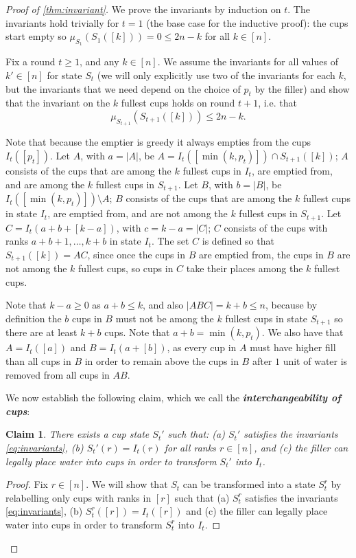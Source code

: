 \documentclass[twocolumn]{article}[10pt]
\newcommand{\defn}[1]{{\textit{\textbf{\boldmath #1}}}\xspace}
\newtheorem{clm}{Claim}
\begin{document}
\begin{proof}[Proof of \cref{thm:invariant}]
We prove the invariants by induction on $t$.
The invariants hold trivially for $t=1$ (the base case for the inductive proof): 
the cups start empty so $\mu_{S_1}(S_1([k])) = 0 \le 2n-k$ for all $k \in [n]$.

Fix a round $t \ge 1$, and any $k \in [n]$. We assume the invariants for all
values of $k' \in[n]$ for state $S_t$ (we will only explicitly use two of the
invariants for each $k$, but the invariants that we need depend on the
choice of $p_t$ by the filler) and show that
the invariant on the $k$ fullest cups holds on round $t+1$, i.e. that
$$\mu_{S_{t+1}}(S_{t+1}([k])) \le 2n-k.$$

Note that because the emptier is greedy it always empties from the cups
$I_t([p_t])$. Let $A$, with $a=|A|$, be $A = I_t([\min(k, p_t)]) \cap
S_{t+1}([k])$; $A$ consists of the cups that are among the $k$ fullest cups in
$I_t$, are emptied from, and are among the $k$ fullest cups in $S_{t+1}$. Let
$B$, with $b=|B|$, be $I_t([\min(k, p_t)]) \setminus A$; $B$ consists of the
cups that are among the $k$ fullest cups in state $I_t$, are emptied from, and
are not among the $k$ fullest cups in $S_{t+1}$. Let $C = I_t(a+b+[k-a])$, with
$c=k-a = |C|$; $C$ consists of the cups with ranks $a + b + 1, \ldots, k + b$
in state $I_t$. The set $C$ is defined so that $S_{t+1}([k]) = AC$, since once
the cups in $B$ are emptied from, the cups in $B$ are not among the $k$ fullest
cups, so cups in $C$ take their places among the $k$ fullest cups.

Note that $k-a \ge 0$ as $a+b \le k$, and also $|ABC| = k+b \le n$, because by
definition the $b$ cups in $B$ must not be among the $k$ fullest cups in state
$S_{t+1}$ so there are at least $k+b$ cups. 
Note that $a + b = \min(k, p_t)$. We also have that $A = I_t([a])$ and $B =
I_t(a+[b])$, as every cup in $A$ must have higher fill than all cups in $B$ in
order to remain above the cups in $B$ after $1$ unit of water is removed from
all cups in $AB$.

We now establish the following claim, which we call the \defn{interchangeability of cups}:
\begin{clm}
  \label{clm:interchangable}
  There exists a cup state $S_t'$ such that: (a) $S_t'$ satisfies the
  invariants \eqref{eq:invariants}, (b) $S_t'(r) = I_t(r)$ for all ranks
  $r\in[n]$, and (c) the filler can legally place water into cups in order to
  transform $S_t'$ into $I_t$. 
\end{clm}
\begin{proof}
  Fix $r \in [n]$. We will show that $S_t$ can be transformed into a state
  $S_t^r$ by relabelling only cups with ranks in $[r]$ such that (a) $S_t^r$
  satisfies the invariants \eqref{eq:invariants}, (b) $S_t^r([r]) = I_t([r])$
  and (c) the filler can legally place water into cups in order to transform
  $S_t^r$ into $I_t$.


\end{proof}
\end{proof}
\end{document}
